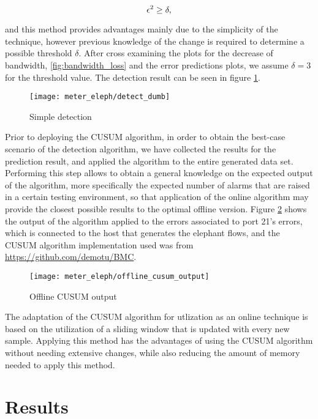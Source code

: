 \begin{equation*}
    \centering
    \label{eq:division}
    \epsilon^2 \geq \delta,
\end{equation*}

\par and this method provides advantages mainly due to the simplicity of the technique, however previous knowledge of the change is required to determine a possible threshold $\delta$. After cross examining the plots for the decrease of bandwidth, 
\ref{fig:bandwidth_loss} and the error predictions plots, we assume $\delta = 3$ for the threshold value. The detection result can be seen in figure \ref{fig:detect_dumb}.

\begin{figure}[H]
    \centering
    \texttt{[image: meter\_eleph/detect\_dumb]}
    \caption {Simple detection}
    \label{fig:detect_dumb}
\end{figure} 

\par Prior to deploying the CUSUM algorithm, in order to obtain the best-case scenario of the detection algorithm, we have collected the results for the prediction result, and applied the algorithm to the entire generated data set. Performing this step allows
to obtain a general knowledge on the expected output of the algorithm, more specifically the expected number of alarms that are raised in a certain testing environment, so that application of the online algorithm may provide the closest possible results to the
optimal offline version. Figure  \ref{fig:offline_cusum} shows the output of the algorithm applied to the errors associated to port 21's errors, which is connected to the host that generates the elephant flows, and the CUSUM algorithm implementation used was from 
\url{https://github.com/demotu/BMC}.

\begin{figure} [H]
    \centering
    \texttt{[image: meter\_eleph/offline\_cusum\_output]}
    \caption {Offline CUSUM output}
    \label{fig:offline_cusum}
\end{figure} 

\par The adaptation of the CUSUM algorithm for utlization as an online technique is based on the utilization of a sliding window that is updated with every new sample. Applying this method has the advantages of using the CUSUM algorithm without needing
extensive changes, while also reducing the amount of memory needed to apply this method. 

% 

\section {Results}

